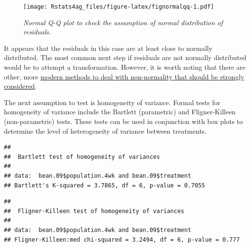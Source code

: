 \documentclass[letterpaper,]{book}
\newenvironment{Shaded}{\begin{snugshade}}{\end{snugshade}}
\newcommand{\FloatTok}[1]{\textcolor[rgb]{0.00,0.00,0.81}{#1}}
\newcommand{\KeywordTok}[1]{\textcolor[rgb]{0.13,0.29,0.53}{\textbf{#1}}}
\newcommand{\NormalTok}[1]{#1}
\newcommand{\OperatorTok}[1]{\textcolor[rgb]{0.81,0.36,0.00}{\textbf{#1}}}
\begin{document}
\begin{figure}
\centering
\texttt{[image: Rstats4ag\_files/figure-latex/fignormalqq-1.pdf]}
\caption{\label{fig:fignormalqq}\emph{Normal Q-Q plot to check the assumption of normal distribution of residuals.}}
\end{figure}

It appears that the residuals in this case are at least close to normally distributed. The most common next step if residuals are not normally distributed would be to attempt a transformation. However, it is worth noting that there are other, more \href{https://dl.sciencesocieties.org/publications/aj/articles/107/2/811}{modern methods to deal with non-normality that should be strongly considered}.

The next assumption to test is homogeneity of variance. Formal tests for homogeneity of variance include the Bartlett (parametric) and Fligner-Killeen (non-parametric) tests. These tests can be used in conjunction with box plots to determine the level of heterogeneity of variance between treatments.

\begin{Shaded}
\end{Shaded}

\begin{verbatim}
## 
##  Bartlett test of homogeneity of variances
## 
## data:  bean.09$population.4wk and bean.09$treatment
## Bartlett's K-squared = 3.7865, df = 6, p-value = 0.7055
\end{verbatim}

\begin{Shaded}
\end{Shaded}

\begin{verbatim}
## 
##  Fligner-Killeen test of homogeneity of variances
## 
## data:  bean.09$population.4wk and bean.09$treatment
## Fligner-Killeen:med chi-squared = 3.2494, df = 6, p-value = 0.777
\end{verbatim}
\end{document}
